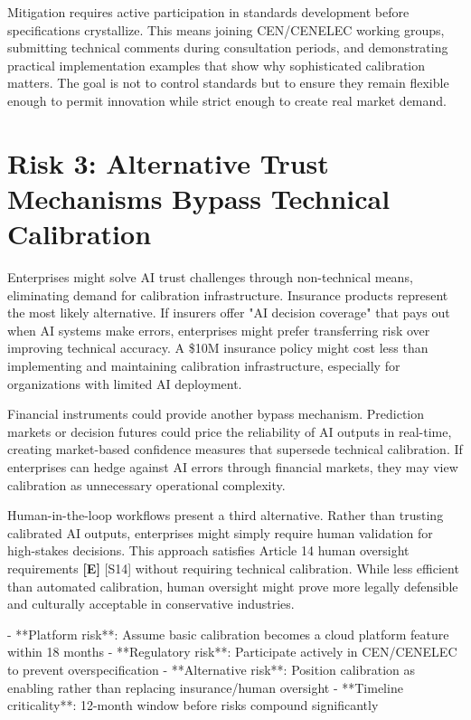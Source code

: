 \documentclass[a4paper,11pt]{article}
\newcommand{\elabel}{\textbf{\textcolor{ecolor}{[E]}}}
\begin{document}
Mitigation requires active participation in standards development before specifications crystallize. This means joining CEN/CENELEC working groups, submitting technical comments during consultation periods, and demonstrating practical implementation examples that show why sophisticated calibration matters. The goal is not to control standards but to ensure they remain flexible enough to permit innovation while strict enough to create real market demand.


\section{Risk 3: Alternative Trust Mechanisms Bypass Technical Calibration}

Enterprises might solve AI trust challenges through non-technical means, eliminating demand for calibration infrastructure. Insurance products represent the most likely alternative. If insurers offer "AI decision coverage" that pays out when AI systems make errors, enterprises might prefer transferring risk over improving technical accuracy. A \$10M insurance policy might cost less than implementing and maintaining calibration infrastructure, especially for organizations with limited AI deployment.


Financial instruments could provide another bypass mechanism. Prediction markets or decision futures could price the reliability of AI outputs in real-time, creating market-based confidence measures that supersede technical calibration. If enterprises can hedge against AI errors through financial markets, they may view calibration as unnecessary operational complexity.


Human-in-the-loop workflows present a third alternative. Rather than trusting calibrated AI outputs, enterprises might simply require human validation for high-stakes decisions. This approach satisfies Article 14 human oversight requirements \elabel{} \textcolor{primary}{[S14]} without requiring technical calibration. While less efficient than automated calibration, human oversight might prove more legally defensible and culturally acceptable in conservative industries.


\begin{decisionbox}
- **Platform risk**: Assume basic calibration becomes a cloud platform feature within 18 months
- **Regulatory risk**: Participate actively in CEN/CENELEC to prevent overspecification
- **Alternative risk**: Position calibration as enabling rather than replacing insurance/human oversight
- **Timeline criticality**: 12-month window before risks compound significantly
\end{decisionbox}
\end{document}
